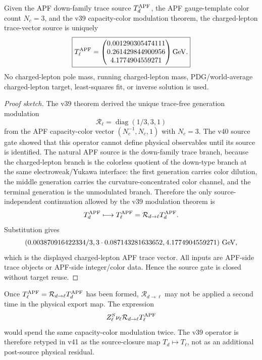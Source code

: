 \begin{theorem}\label{thm:charged-lepton-trace-vector-closure-v41}
Given the APF down-family trace source \(T_d^{\rm APF}\), the APF gauge-template color count \(N_c=3\), and the v39 capacity-color modulation theorem, the charged-lepton trace-vector source is uniquely
\[
   \boxed{
   T_\ell^{\rm APF}
   =
   \begin{pmatrix}
   0.001290305474111\\
   0.261429844900956\\
   4.1774904559271
   \end{pmatrix}{\rm GeV}.}
\]
No charged-lepton pole mass, running charged-lepton mass, PDG/world-average charged-lepton target, least-squares fit, or inverse solution is used.
\end{theorem}

\begin{proof}[Proof sketch]
The v39 theorem derived the unique trace-free generation modulation
\[
  \mathcal R_\ell=\operatorname{diag}(1/3,3,1)
\]
from the APF capacity-color vector \((N_c^{-1},N_c,1)\) with \(N_c=3\).  The v40 source gate showed that this operator cannot define physical observables until its source is identified.  The natural APF source is the down-family trace branch, because the charged-lepton branch is the colorless quotient of the down-type branch at the same electroweak/Yukawa interface: the first generation carries color dilution, the middle generation carries the curvature-concentrated color channel, and the terminal generation is the unmodulated branch.  Therefore the only source-independent continuation allowed by the v39 modulation theorem is
\[
  T_d^{\rm APF}\longmapsto T_\ell^{\rm APF}=\mathcal R_{d\to\ell}T_d^{\rm APF}.
\]
Substitution gives
\[
  (0.003870916422334/3,
  3\cdot0.087143281633652,
  4.1774904559271)\ {\rm GeV},
\]
which is the displayed charged-lepton APF trace vector.  All inputs are APF-side trace objects or APF-side integer/color data.  Hence the source gate is closed without target reuse.
\end{proof}

\begin{corollary}\label{cor:no-double-R-v41}
Once \(T_\ell^{\rm APF}=\mathcal R_{d\to\ell}T_d^{\rm APF}\) has been formed, \(\mathcal R_{d\to\ell}\) may not be applied a second time in the physical export map.  The expression
\[
  Z_\ell^S\nu_\ell\mathcal R_{d\to\ell}T_\ell^{\rm APF}
\]
would spend the same capacity-color modulation twice.  The v39 operator is therefore retyped in v41 as the source-closure map \(T_d\mapsto T_\ell\), not as an additional post-source physical residual.
\end{corollary}

